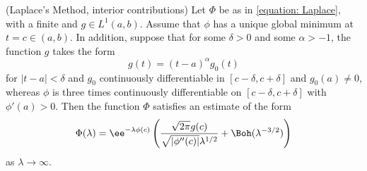 \begin{teorema}
	(Laplace's Method, interior contributions) Let $\Phi$ be as in \ref{equation: Laplace}, with a finite and $g \in L^1(a,b)$. Assume that $\phi$ has a unique global minimum at $t=c \in (a,b)$. In addition, suppose that for some $\delta > 0$ and some $\alpha > -1$, the function $g$ takes the form
	\begin{equation}
		g(t) = (t-a)^{\alpha} g_0(t)
	\end{equation}
	for $|t-a| < \delta$ and $g_0$ continuously differentiable in $[c-\delta, c+\delta]$ and $g_0(a) \neq 0$, whereas $\phi$ is three times continuously differentiable on $[c-\delta, c+\delta]$ with $\phi'(a) > 0$. Then the function $\Phi$ satisfies an estimate of the form
	\begin{equation}
		\Phi(\lambda) = \ee^{-\lambda \phi(c)} \left( \frac{\sqrt{2\pi} g(c)}{\sqrt{|\phi''(c)|}\lambda^{1/2}} + \Boh(\lambda^{-3/2})\right)
	\end{equation}
	as $\lambda \rightarrow \infty$.
	\label{prop: (Laplace's Method, interior contributions)}
\end{teorema}


